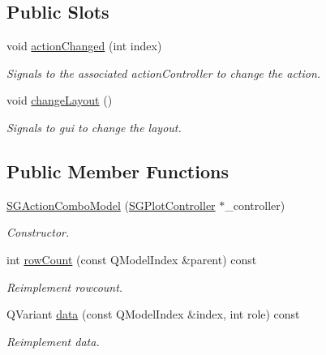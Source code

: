 \subsection*{Public Slots}
\begin{DoxyCompactItemize}
\item 
\mbox{\label{classSGActionComboModel_a66d596fb4ca91f5f4fe3f8d42ce12634}} 
void \hyperlink{classSGActionComboModel_a66d596fb4ca91f5f4fe3f8d42ce12634}{action\+Changed} (int index)
\begin{DoxyCompactList}\small\item\em Signals to the associated action\+Controller to change the action. \end{DoxyCompactList}\item 
\mbox{\label{classSGActionComboModel_a20046762e7cd9a5e3ceeadb382a04294}} 
void \hyperlink{classSGActionComboModel_a20046762e7cd9a5e3ceeadb382a04294}{change\+Layout} ()
\begin{DoxyCompactList}\small\item\em Signals to gui to change the layout. \end{DoxyCompactList}\end{DoxyCompactItemize}
\subsection*{Public Member Functions}
\begin{DoxyCompactItemize}
\item 
\mbox{\label{classSGActionComboModel_a86bc33aa551e463e9b527b831cc95162}} 
\hyperlink{classSGActionComboModel_a86bc33aa551e463e9b527b831cc95162}{S\+G\+Action\+Combo\+Model} (\hyperlink{classSGPlotController}{S\+G\+Plot\+Controller} $\ast$\+\_\+controller)
\begin{DoxyCompactList}\small\item\em Constructor. \end{DoxyCompactList}\item 
\mbox{\label{classSGActionComboModel_a6a070739e0bdbf37f72728b5b315dc7e}} 
int \hyperlink{classSGActionComboModel_a6a070739e0bdbf37f72728b5b315dc7e}{row\+Count} (const Q\+Model\+Index \&parent) const
\begin{DoxyCompactList}\small\item\em Reimplement rowcount. \end{DoxyCompactList}\item 
\mbox{\label{classSGActionComboModel_a40b862e251b8af402683a413fbe4aaf6}} 
Q\+Variant \hyperlink{classSGActionComboModel_a40b862e251b8af402683a413fbe4aaf6}{data} (const Q\+Model\+Index \&index, int role) const
\begin{DoxyCompactList}\small\item\em Reimplement data. \end{DoxyCompactList}\end{DoxyCompactItemize}
